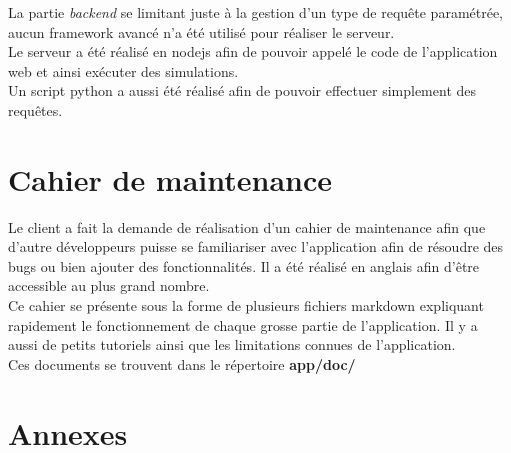 \documentclass[french]{article}
\begin{document}
La partie \textit{backend} se limitant juste à la gestion d'un type de requête paramétrée, aucun framework avancé n'a été utilisé pour réaliser le serveur.\\

Le serveur a été réalisé en nodejs afin de pouvoir appelé le code de l'application web et ainsi exécuter des simulations.\\

Un script python a aussi été réalisé afin de pouvoir effectuer simplement des requêtes.

\section {Cahier de maintenance}

Le client a fait la demande de réalisation d'un cahier de maintenance afin que d'autre développeurs puisse se familiariser avec l'application afin de résoudre des bugs ou bien ajouter des fonctionnalités. Il a été réalisé en anglais afin d'être accessible au plus grand nombre.\\

Ce cahier se présente sous la forme de plusieurs fichiers markdown expliquant rapidement le fonctionnement de chaque grosse partie de l'application. Il y a aussi de petits tutoriels ainsi que les limitations connues de l'application.\\

Ces documents se trouvent dans le répertoire \textbf{app/doc/}

\newpage
\printbibliography

\section{Annexes}
\end{document}
